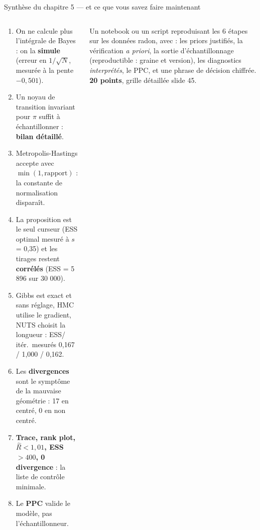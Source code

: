 \begin{frame}{Synthèse du chapitre 5 --- et ce que vous savez faire maintenant}
\begin{columns}[t]
\begin{column}{0.52\textwidth}
\begin{tcolorbox}[enhanced,colback=byPurple!7,colframe=byPurple,arc=2mm,
   title={\bfseries\color{white}\faLightbulb\ Les huit idées du chapitre},
   colbacktitle=byPurple,
   attach boxed title to top left={xshift=3mm,yshift=-2mm},
   boxed title style={arc=1mm,boxrule=0pt}]
\begin{enumerate}
  \item On ne calcule plus l'intégrale de Bayes : on la \textbf{simule}
        (erreur en $1/\sqrt N$, mesurée à la pente $-0{,}501$).
  \item Un noyau de transition invariant pour $\pi$ suffit à échantillonner :
        \textbf{bilan détaillé}.
  \item Metropolis-Hastings accepte avec $\min(1, \text{rapport})$ : la constante
        de normalisation disparaît.
  \item La proposition est le seul curseur (ESS optimal mesuré à $s$ = 0,35) et
        les tirages restent \textbf{corrélés} (ESS = 5 896 sur 30 000).
  \item Gibbs est exact et sans réglage, HMC utilise le gradient, NUTS choisit
        la longueur : ESS/\,itér.\ mesurés 0,167 / 1,000 / 0,162.
  \item Les \textbf{divergences} sont le symptôme de la mauvaise géométrie :
        17 en centré, 0 en non centré.
  \item \textbf{Trace, rank plot, $\hat R < 1{,}01$, ESS $> 400$, 0 divergence} :
        la liste de contrôle minimale.
  \item Le \textbf{PPC} valide le modèle, pas l'échantillonneur.
\end{enumerate}
\end{tcolorbox}
\end{column}
\begin{column}{0.46\textwidth}
\begin{abox}
Un notebook ou un script reproduisant les 6 étapes sur les données radon, avec :
les priors justifiés, la vérification \emph{a priori}, la sortie d'échantillonnage
(reproductible : graine et version), les diagnostics \emph{interprétés}, le PPC, et
une phrase de décision chiffrée. \textbf{20 points}, grille détaillée slide 45.
\end{abox}
\vspace{1mm}
\end{column}
\end{columns}
\end{frame}

